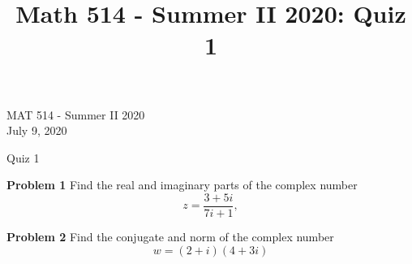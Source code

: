 \documentclass[12pt,oneside]{exam}
\title{Math 514 - Summer II 2020: Quiz 1}
\newenvironment{exercise}[1]{\vspace{.1in}\noindent\textbf{Problem #1 \hspace{.05em}}}{}
\begin{document}
\begin{flushright}
\sc MAT 514 - Summer II 2020\\
July 9, 2020
\end{flushright}
\bigskip
 
\begin{center}
\textsf{Quiz 1} 
\end{center}


\begin{exercise}{1}
Find the real and imaginary parts of the complex number
\begin{equation*}
z=\frac{3+5i}{7i+1},
\end{equation*}
\end{exercise}

\vfill
\begin{exercise}{2}
Find the conjugate and norm of the complex number
\begin{equation*}
w=(2+i)(4+3i)
\end{equation*}
\end{exercise}
\vfill
\end{document}
